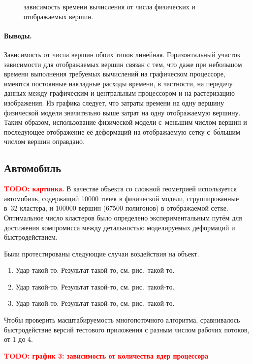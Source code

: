 \documentclass[a4paper, 14pt, titlepage]{extarticle}
\newcommand{\todo}[1]{\textbf{\textcolor{red}{TODO: #1}}}
\newcommand{\includefigure}[3][]{
    \begin{figure}[!htb]
      \center{\texttt{[image: \#2]}}
      \caption{#3} \label{fig:#2}
    \end{figure}
  }
\begin{document}
      \includefigure[width=1\linewidth]{time-plot}{зависимость времени вычисления от числа физических и отображаемых вершин.}

      \paragraph{Выводы.} Зависимость от числа вершин обоих типов линейная.
      Горизонтальный участок зависимости для отображаемых вершин связан с тем, что даже при
      небольшом времени выполнения требуемых вычислений на графическом процессоре, имеются
      постоянные накладные расходы времени, в частности, на передачу данных между графическим и центральным
      процессором и на растеризацию изображения. Из графика следует, что затраты времени на
      одну вершину физической модели значительно выше затрат на одну отображаемую вершину. Таким
      образом, использование физической модели с~меньшим числом вершин и последующее отображение
      её деформаций на отображаемую сетку с~б\'{о}льшим числом вершин оправдано.

    \subsection{Автомобиль}

      \todo{картинка.} В качестве объекта со сложной геометрией используется автомобиль, содержащий
      10000 точек в физической модели, сгруппированные в~32 кластера, и 100000 вершин (67500
      полигонов) в отображаемой сетке. Оптимальное число кластеров было определено экспериментальным
      путём для достижения компромисса между детальностью моделируемых деформаций и быстродействием.

      Были протестированы следующие случаи воздействия на объект.
      \begin{enumerate}
        \item Удар такой-то. Результат такой-то, см. рис.~такой-то.
        \item Удар такой-то. Результат такой-то, см. рис.~такой-то.
        \item Удар такой-то. Результат такой-то, см. рис.~такой-то.
      \end{enumerate}

      Чтобы проверить масштабируемость многопоточного алгоритма, сравнивалось быстродействие версий
      тестового приложения с разным числом рабочих потоков, от 1 до 4.

      \todo{график 3: зависимость от количества ядер процессора}
\end{document}
